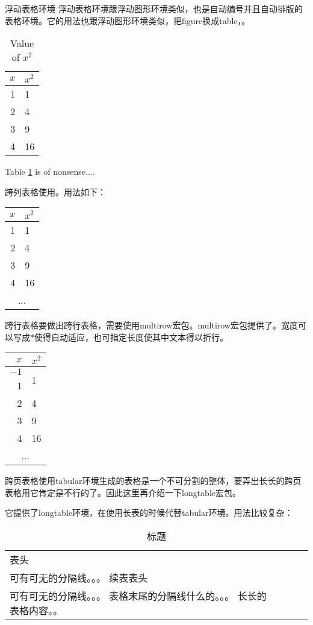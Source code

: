 \begin{enumerate}[fullwidth,itemindent=2em,label=(\arabic*)]
浮动表格环境
浮动表格环境跟浮动图形环境类似，也是自动编号并且自动排版的表格环境。它的用法也跟浮动图形环境类似，把figure换成table，。\begin{table}[htbp]
\centering
\begin{tabular}{|r||l|}
    \hline
    $x$ & $x^2$ \\
    \hline \hline
    1 & 1  \\ \hline
    2 & 4  \\ \cline{1-1}
    3 & 9  \\ \hline
    4 & 16 \\ \hline
\end{tabular}
\caption{Value of $x^2$}
\label{tbl:square}
\end{table}
Table \ref{tbl:square} is of nonsense....


跨列表格使用。用法如下：

\begin{tabular}{|r||l|}
    \hline
    $x$ & $x^2$ \\
    \hline \hline
    1 & 1  \\ \hline
    2 & 4  \\ \cline{1-1}
    3 & 9  \\ \hline
    4 & 16 \\ \hline
    \multicolumn{2}{|c|}{...}\\ \hline
\end{tabular}

跨行表格要做出跨行表格，需要使用multirow宏包。multirow宏包提供了。宽度可以写成*使得自动适应，也可指定长度使其中文本得以折行。\begin{tabular}{|r||l|}
    \hline
    $x$ & $x^2$ \\
    \hline \hline
    $-1$ & \multirow{2}{*}{1} \\ \cline{1-1}
    1 & \\ \hline
    2 & 4  \\ \cline{1-1}
    3 & 9  \\ \hline
    4 & 16 \\ \hline
    \multicolumn{2}{|c|}{...}\\ \hline
\end{tabular}

跨页表格使用tabular环境生成的表格是一个不可分割的整体，要弄出长长的跨页表格用它肯定是不行的了。因此这里再介绍一下longtable宏包。\usepackage{longtable}它提供了longtable环境，在使用长表的时候代替tabular环境。用法比较复杂：\begin{longtable}{对齐方式}
\caption{标题}\label{标签}\\ %
表头\\
可有可无的分隔线。。。
\endfirsthead
续表表头\\
可有可无的分隔线。。。
\endhead
表格末尾的分隔线什么的。。。
\endfoot
长长的表格内容。。
\end{longtable}


\end{enumerate}
